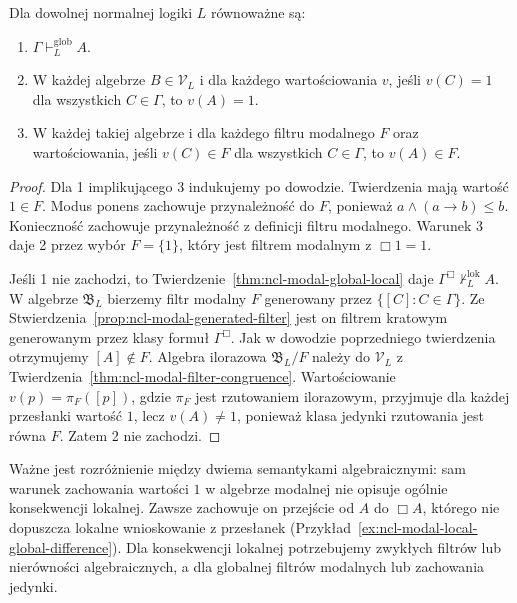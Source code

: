 \begin{twierdzenie}
\label{thm:ncl-modal-global-algebra-completeness}
Dla dowolnej normalnej logiki $L$ równoważne są:
\begin{enumerate}
\item $\Gamma\vdash_L^{\mathrm{glob}}A$.
\item W każdej algebrze $B\in\mathcal V_L$
      i dla każdego wartościowania $v$,
      jeśli $v(C)=1$ dla wszystkich $C\in\Gamma$,
      to $v(A)=1$.
\item W każdej takiej algebrze i dla każdego
      filtru modalnego $F$ oraz wartościowania,
      jeśli $v(C)\in F$ dla wszystkich $C\in\Gamma$,
      to $v(A)\in F$.
\end{enumerate}
\end{twierdzenie}
\begin{proof}
Dla 1 implikującego 3 indukujemy po dowodzie.
Twierdzenia mają wartość $1\in F$.
Modus ponens zachowuje przynależność do $F$,
ponieważ $a\wedge(a\to b)\leq b$.
Konieczność zachowuje przynależność z definicji
filtru modalnego.
Warunek 3 daje 2 przez wybór $F=\{1\}$,
który jest filtrem modalnym z $\Box1=1$.

Jeśli 1 nie zachodzi, to
Twierdzenie~\ref{thm:ncl-modal-global-local}
daje $\Gamma^\Box\nvdash_L^{\mathrm{lok}} A$.
W algebrze $\mathfrak B_L$ bierzemy filtr
modalny $F$ generowany przez $\{[C]:C\in\Gamma\}$.
Ze Stwierdzenia~\ref{prop:ncl-modal-generated-filter}
jest on filtrem kratowym generowanym przez
klasy formuł $\Gamma^\Box$.
Jak w dowodzie poprzedniego twierdzenia
otrzymujemy $[A]\notin F$.
Algebra ilorazowa $\mathfrak B_L/F$ należy
do $\mathcal V_L$ z
Twierdzenia~\ref{thm:ncl-modal-filter-congruence}.
Wartościowanie $v(p)=\pi_F([p])$, gdzie $\pi_F$
jest rzutowaniem ilorazowym, przyjmuje
dla każdej przesłanki wartość $1$, lecz
$v(A)\ne1$, ponieważ klasa jedynki rzutowania
jest równa $F$. Zatem 2 nie zachodzi.
\end{proof}

Ważne jest rozróżnienie między dwiema
semantykami algebraicznymi: sam warunek
zachowania wartości $1$ w algebrze modalnej
nie opisuje ogólnie konsekwencji lokalnej.
Zawsze zachowuje on przejście od $A$ do $\Box A$,
którego nie dopuszcza lokalne wnioskowanie
z przesłanek (Przykład~\ref{ex:ncl-modal-local-global-difference}).
Dla konsekwencji lokalnej potrzebujemy
zwykłych filtrów lub nierówności algebraicznych,
a dla globalnej filtrów modalnych lub zachowania
jedynki.


